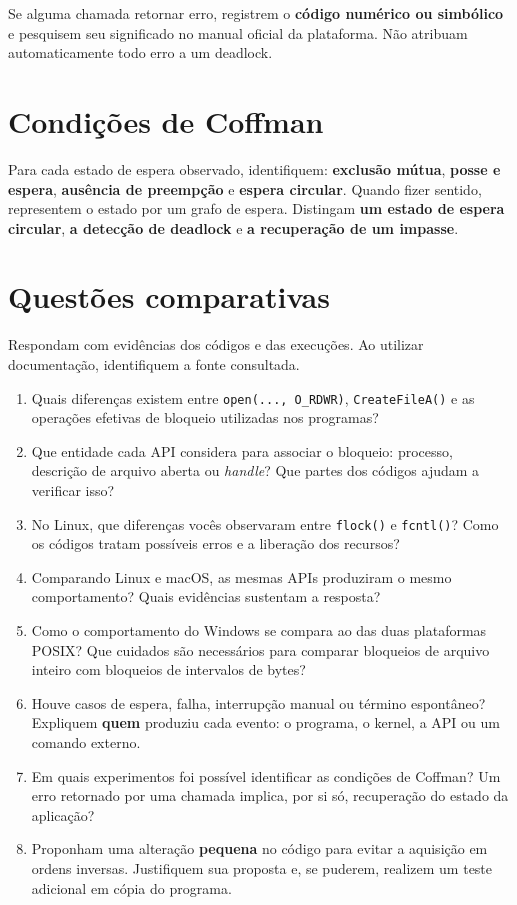 \documentclass[11pt,a4paper]{article}
\begin{document}
Se alguma chamada retornar erro, registrem o \textbf{código numérico ou simbólico} e pesquisem seu significado no manual oficial da plataforma. Não atribuam automaticamente todo erro a um deadlock.

\section{Condições de Coffman}
Para cada estado de espera observado, identifiquem: \textbf{exclusão mútua}, \textbf{posse e espera}, \textbf{ausência de preempção} e \textbf{espera circular}. Quando fizer sentido, representem o estado por um grafo de espera. Distingam \textbf{um estado de espera circular}, \textbf{a detecção de deadlock} e \textbf{a recuperação de um impasse}.

\section{Questões comparativas}
Respondam com evidências dos códigos e das execuções. Ao utilizar documentação, identifiquem a fonte consultada.
\begin{enumerate}[label=Q\arabic*.]
\item Quais diferenças existem entre \texttt{open(..., O\_RDWR)}, \texttt{CreateFileA()} e as operações efetivas de bloqueio utilizadas nos programas?
\item Que entidade cada API considera para associar o bloqueio: processo, descrição de arquivo aberta ou \textit{handle}? Que partes dos códigos ajudam a verificar isso?
\item No Linux, que diferenças vocês observaram entre \texttt{flock()} e \texttt{fcntl()}? Como os códigos tratam possíveis erros e a liberação dos recursos?
\item Comparando Linux e macOS, as mesmas APIs produziram o mesmo comportamento? Quais evidências sustentam a resposta?
\item Como o comportamento do Windows se compara ao das duas plataformas POSIX? Que cuidados são necessários para comparar bloqueios de arquivo inteiro com bloqueios de intervalos de bytes?
\item Houve casos de espera, falha, interrupção manual ou término espontâneo? Expliquem \textbf{quem} produziu cada evento: o programa, o kernel, a API ou um comando externo.
\item Em quais experimentos foi possível identificar as condições de Coffman? Um erro retornado por uma chamada implica, por si só, recuperação do estado da aplicação?
\item Proponham uma alteração \textbf{pequena} no código para evitar a aquisição em ordens inversas. Justifiquem sua proposta e, se puderem, realizem um teste adicional em cópia do programa.
\end{enumerate}
\end{document}

